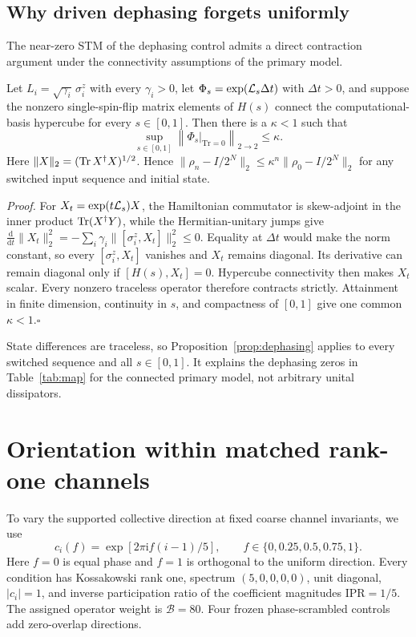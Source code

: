 \subsection{Why driven dephasing forgets uniformly}

The near-zero STM of the dephasing control admits a direct contraction
argument under the connectivity assumptions of the primary model.

\begin{proposition}
\label{prop:dephasing}
Let \(L_i=\sqrt{\gamma_i}\,\sigma_i^z\) with every \(\gamma_i>0\), let
\(\Phi_s=\exp(\mathcal{L}_s\Delta t)\) with \(\Delta t>0\), and suppose the nonzero
single-spin-flip matrix elements of \(H(s)\) connect the computational-basis
hypercube for every \(s\in[0,1]\). Then there is a \(\kappa<1\) such that
\[
\sup_{s\in[0,1]}
\left\|\Phi_s|_{\mathrm{Tr}=0}\right\|_{2\rightarrow2}\le\kappa .
\]
Here \(\|X\|_2=(\operatorname{Tr} X^\dagger X)^{1/2}\).  Hence
\(\|\rho_n-I/2^N\|_2\le\kappa^n\|\rho_0-I/2^N\|_2\) for any switched input
sequence and initial state.
\end{proposition}

\emph{Proof.}
For \(X_t=\exp(t\mathcal{L}_s)X\), the Hamiltonian commutator is skew-adjoint in the
inner product \(\operatorname{Tr}(X^\dagger Y)\), while the Hermitian-unitary jumps give
\(\frac{\mathrm d}{\mathrm dt}\|X_t\|_2^2
=-\sum_i\gamma_i\|[\sigma_i^z,X_t]\|_2^2\le0\).
Equality at \(\Delta t\) would make the norm constant, so every
\([\sigma_i^z,X_t]\) vanishes and \(X_t\) remains diagonal.  Its derivative can
remain diagonal only if \([H(s),X_t]=0\).  Hypercube connectivity then makes
\(X_t\) scalar.  Every nonzero traceless operator therefore contracts
strictly.  Attainment in finite dimension, continuity in \(s\), and
compactness of \([0,1]\) give one common \(\kappa<1\).\hfill\(\square\)

State differences are traceless, so Proposition~\ref{prop:dephasing} applies
to every switched sequence and all \(s\in[0,1]\). It explains the dephasing zeros in
Table~\ref{tab:map} for the connected primary model, not arbitrary unital
dissipators.

\FloatBarrier
\section{Orientation within matched rank-one channels}
\label{app:phase-direction}

To vary the supported collective direction at fixed coarse channel invariants,
we use
\[
  c_i(f)=\exp\!\left[2\pi \mathrm{i}f(i-1)/5\right],\qquad
  f\in\{0,0.25,0.5,0.75,1\}.
\]
Here \(f=0\) is equal phase and \(f=1\) is orthogonal to the uniform direction.
Every condition has Kossakowski rank one, spectrum
\((5,0,0,0,0)\), unit diagonal, \(|c_i|=1\), and inverse participation ratio
of the coefficient magnitudes \(\mathrm{IPR}=1/5\). The assigned operator
weight is \(\mathcal B=80\). Four frozen phase-scrambled controls add zero-overlap
directions.

